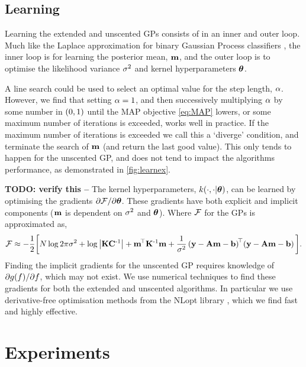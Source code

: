 \documentclass{article} %
\begin{document}
\subsection{Learning}

Learning the extended and unscented GPs consists of in an inner and outer loop.
Much like the Laplace approximation for binary Gaussian Process classifiers
\cite{Rasmussen2006}, the inner loop is for learning the posterior mean,
$\mathbf{m}$, and the outer loop is to optimise the likelihood variance $\sigma^2$ 
and kernel hyperparameters $\boldsymbol\theta$.

A line search could be used to select an optimal value for the step length,
$\alpha$. However, we find that setting $\alpha=1$, and then successively
multiplying $\alpha$ by some number in $\left({0, 1}\right)$ until the MAP objective
\eqref{eq:MAP} lowers, or some maximum number of iterations is exceeded, works 
well in practice. If the maximum number of iterations is exceeded we call this
a `diverge' condition, and terminate the search of $\mathbf{m}$ (and return the
last good value). This only tends to happen for the unscented GP, and does not
tend to impact the algorithms performance, as demonstrated in 
\autoref{fig:learnex}.

\textbf{TODO: verify this --} The kernel hyperparameters,
$k\!\left({{\cdot}, {\cdot|\boldsymbol\theta}}\right)$, can be learned by optimising the gradients
$\partial\mathcal{F}/\partial\boldsymbol\theta$. These gradients have both explicit and
implicit components ($\mathbf{m}$ is dependent on $\sigma^2$ and $\boldsymbol\theta$). Where
$\mathcal{F}$ for the GPs is approximated as,
\begin{equation}
    \mathcal{F} \approx - \frac{1}{2} \bigg[
        N\log{2\pi\ensuremath{\sigma^2}} + \log\left|{\mathbf{K}\mathbf{C}^{\text{-}1}}\right|
    + \mathbf{m}^{\!\top}\mathbf{K}^{\text{-}1} \mathbf{m}
    + \frac{1}{\sigma^2}
        \left({\mathbf{y} - \mathbf{A}\mathbf{m} - \mathbf{b}}\right)^{\!\top}\!
        \left({\mathbf{y} - \mathbf{A}\mathbf{m} - \mathbf{b}}\right)
    \bigg].
    \label{eq:fengygp}
\end{equation}
Finding the implicit gradients for the unscented GP requires knowledge of
$\partial g\!\left({{f}}\right)\!/\partial f$, which may not exist. We use
numerical techniques to find these gradients for both the extended and
unscented algorithms. In particular we use derivative-free optimisation methods
from the NLopt library \cite{JohnsonNLOPT}, which we find fast and highly
effective.


\section{Experiments}
\label{sec:experiments}
\end{document}
